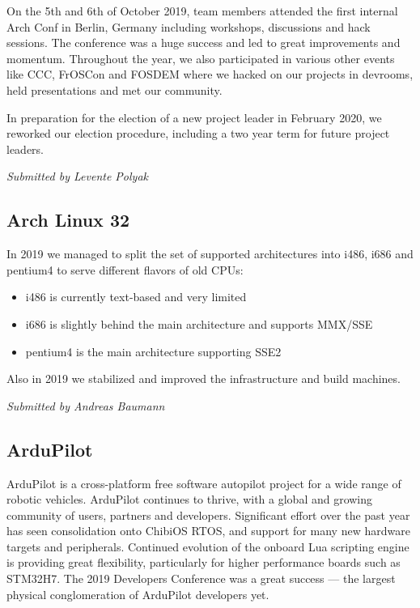 \documentclass[a4paper]{report}
\begin{document}
On the 5th and 6th of October 2019, team members attended the first
internal Arch Conf in Berlin, Germany including workshops, discussions
and hack sessions. The conference was a huge success and led to great
improvements and momentum. Throughout the year, we also participated in
various other events like CCC, FrOSCon and FOSDEM where we hacked on our
projects in devrooms, held presentations and met our community.

In preparation for the election of a new project leader in February
2020, we reworked our election procedure, including a two year term for
future project leaders.

{\em Submitted by Levente Polyak}

\subsection{Arch Linux 32}

In 2019 we managed to split the set of supported architectures into
i486, i686 and pentium4 to serve different flavors of old CPUs:

\begin{itemize}

\item i486 is currently text-based and very limited
\item i686 is slightly behind the main architecture and supports MMX/SSE
\item pentium4 is the main architecture supporting SSE2

\end{itemize}

Also in 2019 we stabilized and improved the infrastructure and build
machines.

{\em Submitted by Andreas Baumann}

\subsection{ArduPilot}

ArduPilot is a cross-platform free software autopilot project for a wide
range of robotic vehicles. ArduPilot continues to thrive, with a global
and growing community of users, partners and developers. Significant
effort over the past year has seen consolidation onto ChibiOS RTOS, and
support for many new hardware targets and peripherals.  Continued
evolution of the onboard Lua scripting engine is providing great
flexibility, particularly for higher performance boards such as STM32H7.
The 2019 Developers Conference was a great success --- the largest
physical conglomeration of ArduPilot developers yet.
\end{document}
